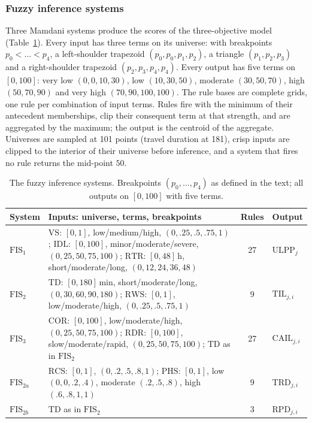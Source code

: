 \subsubsection{Fuzzy inference systems}
Three Mamdani systems produce the scores of the three-objective model
(Table~\ref{tab:fis}). Every input has three terms on its universe: with breakpoints
$p_0<\dots<p_4$, a left-shoulder trapezoid $(p_0,p_0,p_1,p_2)$, a triangle $(p_1,p_2,p_3)$ and a
right-shoulder trapezoid $(p_2,p_3,p_4,p_4)$. Every output has five terms on $[0,100]$: very low
$(0,0,10,30)$, low $(10,30,50)$, moderate $(30,50,70)$, high $(50,70,90)$ and very high
$(70,90,100,100)$. The rule bases are complete grids, one rule per combination of input terms.
Rules fire with the minimum of their antecedent memberships, clip their consequent term at
that strength, and are aggregated by the maximum; the output is the centroid of the
aggregate. Universes are sampled at 101 points (travel duration at 181), crisp inputs are
clipped to the interior of their universe before inference, and a system that fires no rule
returns the mid-point $50$.

\begin{table}[H]
\centering
\caption{The fuzzy inference systems. Breakpoints $(p_0,\dots,p_4)$ as defined in the text;
all outputs on $[0,100]$ with five terms.\label{tab:fis}}
\small
\begin{tabularx}{\textwidth}{@{}l>{\raggedright\arraybackslash}Xcl@{}}
\toprule
System & Inputs: universe, terms, breakpoints & Rules & Output\\
\midrule
$\mathrm{FIS}_1$ & $\mathrm{VS}$: $[0,1]$, low/medium/high, $(0,.25,.5,.75,1)$;
$\mathrm{IDL}$: $[0,100]$, minor/moderate/severe, $(0,25,50,75,100)$;
$\mathrm{RTR}$: $[0,48]$\,h, short/moderate/long, $(0,12,24,36,48)$ & 27 & $\mathrm{ULPP}_j$\\
$\mathrm{FIS}_2$ & $\mathrm{TD}$: $[0,180]$\,min, short/moderate/long, $(0,30,60,90,180)$;
$\mathrm{RWS}$: $[0,1]$, low/moderate/high, $(0,.25,.5,.75,1)$ & 9 & $\mathrm{TIL}_{j,i}$\\
$\mathrm{FIS}_3$ & $\mathrm{COR}$: $[0,100]$, low/moderate/high, $(0,25,50,75,100)$;
$\mathrm{RDR}$: $[0,100]$, slow/moderate/rapid, $(0,25,50,75,100)$;
$\mathrm{TD}$ as in $\mathrm{FIS}_2$ & 27 & $\mathrm{CAIL}_{j,i}$\\
\midrule
$\mathrm{FIS}_{2a}$ & $\mathrm{RCS}$: $[0,1]$, $(0,.2,.5,.8,1)$; $\mathrm{PHS}$: $[0,1]$, low
$(0,0,.2,.4)$, moderate $(.2,.5,.8)$, high $(.6,.8,1,1)$ & 9 & $\mathrm{TRD}_{j,i}$\\
$\mathrm{FIS}_{2b}$ & $\mathrm{TD}$ as in $\mathrm{FIS}_2$ & 3 & $\mathrm{RPD}_{j,i}$\\
\bottomrule
\end{tabularx}
\end{table}

